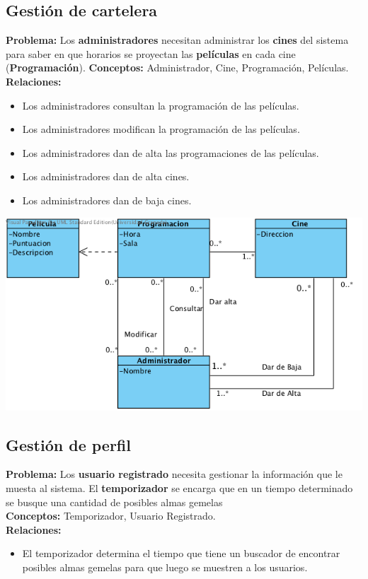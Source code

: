 \documentclass{article}
\begin{document}
	\subsection*{Gestión de cartelera}
	\textbf{Problema:} Los \textbf{administradores} necesitan administrar los \textbf{cines} del sistema para saber en que horarios se proyectan 
	las \textbf{películas} en cada cine (\textbf{Programación}).
	\textbf{Conceptos:} Administrador, Cine, Programación, Películas.\\
	\textbf{	Relaciones:}
		\begin{itemize}
			\item Los administradores consultan la programación de las películas.
			\item Los administradores modifican la programación de las películas.
			\item Los administradores dan de alta las programaciones de las películas.
			\item Los administradores dan de alta cines.
			\item Los administradores dan de baja cines.
		\end{itemize}
	\includegraphics[width=1\linewidth]{./C-Cartelera}
	
	
	\subsection*{Gestión de perfil}
	\textbf{Problema:} Los \textbf{usuario registrado} necesita gestionar la información que le muesta al sistema.
El \textbf{temporizador} se encarga que en un tiempo determinado se busque una cantidad de posibles almas gemelas\\
\textbf{Conceptos:} Temporizador, Usuario Registrado.\\
\textbf{	Relaciones:}
	\begin{itemize}
    	\item El temporizador determina el tiempo que tiene un buscador de encontrar posibles almas gemelas para que luego se muestren a los usuarios.      	
    \end{itemize}
\end{document}
